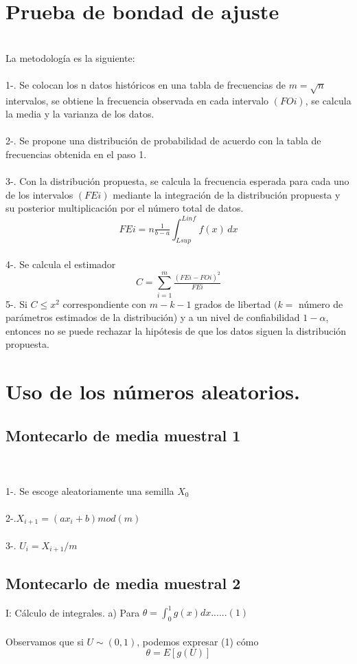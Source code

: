 \documentclass[es-lat]{article}
\begin{document}
\section{Prueba de bondad de ajuste}
\\La metodología es la siguiente:
\\\\1-. Se colocan los n datos históricos en una tabla de frecuencias de $m = \sqrt{n}$ intervalos, se obtiene la frecuencia observada en cada intervalo $(FOi)$, se calcula la media y la varianza de los datos.
\\\\2-. Se propone una distribución de probabilidad de acuerdo con la tabla de frecuencias obtenida en el paso 1.
\\\\3-. Con la distribución propuesta, se calcula la frecuencia esperada para cada uno de los intervalos $(FEi)$ mediante la integración de la distribución propuesta y su posterior multiplicación por el número total de datos. 
\[
FEi= n\tfrac{1}{b-a} \int_{Lsup}^{Linf} \! f(x)  \,dx 
\]
\\4-. Se calcula el estimador 
\[
C=\sum_{i=1}^{m}\tfrac{(FEi-FOi)^2}{FEi}
\]
5-. Si $C\leq x^2$ correspondiente con $m-k-1$ grados de libertad $(k=$ número de parámetros estimados de la distribución) y a un nivel de confiabilidad $1- \alpha$, entonces no se puede rechazar la hipótesis de que los datos siguen la distribución propuesta.\\

\section{Uso de los números aleatorios.}
\subsection{Montecarlo de media muestral 1}
\\\\1-. Se escoge aleatoriamente una semilla $X_{0}$
\\\\2-.$X_{i+1}=(ax_{i}+b)mod(m)$
\\\\3-. $U_{i}=X_{i+1}/m$

\subsection{Montecarlo de media muestral 2}
I: Cálculo de integrales.
a) Para $\theta = \int_{0}^1 g(x)dx......(1)$ 
\\\\Observamos que si $U \sim(0,1)$, podemos expresar (1) cómo 
\[
\theta= E[g(U)]
\]
\newpage
\end{document}
